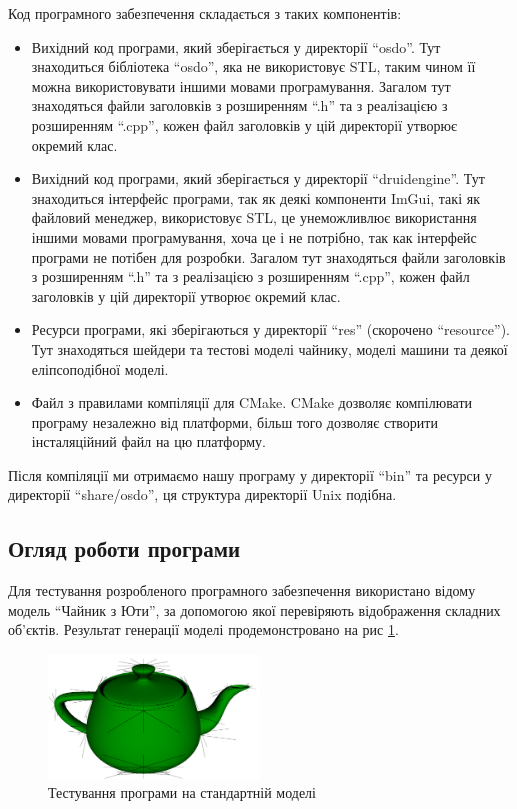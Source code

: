 \let\mypdfximage\pdfximage\def\pdfximage{\immediate\mypdfximage}\documentclass[14pt,a4paper]{extarticle}
\theoremstyle{definition}
\renewcommand{\[}{\begin{singlespace}\begin{equation*}}
\renewcommand{\]}{\end{equation*}\end{singlespace}}
\renewcommand{\+}{\discretionary{\mbox{\scriptsize$\hookleftarrow$}}{}{}}
\begin{document}
Код програмного забезпечення складається з таких компонентів:
\begin{itemize}
\item Вихідний код програми, який зберігається у директорії ``osdo''. Тут знаходиться бібліотека ``osdo'', яка не використовує STL, таким чином її можна використовувати іншими мовами програмування. Загалом тут знаходяться файли заголовків з розширенням ``.h'' та з реалізацією з розширенням ``.cpp'', кожен файл заголовків у цій директорії утворює окремий клас.
\item Вихідний код програми, який зберігається у директорії ``druidengine''. Тут знаходиться інтерфейс програми, так як деякі компоненти ImGui, такі як файловий менеджер, використовує STL, це унеможливлює використання іншими мовами програмування, хоча це і не потрібно, так как інтерфейс програми не потібен для розробки. Загалом тут знаходяться файли заголовків з розширенням ``.h'' та з реалізацією з розширенням ``.cpp'', кожен файл заголовків у цій директорії утворює окремий клас.
\item Ресурси програми, які зберігаються у директорії ``res'' (скорочено ``resource''). Тут знаходяться шейдери та тестові моделі чайнику, моделі машини та деякої еліпсоподібної моделі.
\item Файл з правилами компіляції для CMake. CMake дозволяє компілювати програму незалежно від платформи, більш того дозволяє створити інсталяційний файл на цю платформу.
\end{itemize}

Після компіляції ми отримаємо нашу програму у директорії ``bin'' та ресурси у директорії ``share/osdo'', ця структура директорії Unix подібна.

\subsection{Огляд роботи програми}

Для тестування розробленого програмного забезпечення використано відому модель ``Чайник з Юти'', за допомогою якої перевіряють відображення складних об'єктів.  Результат генерації моделі продемонстровано на рис \ref{fig:testing-teapot}.

\begin{figure}[!htb]
    \centering
    \includegraphics[width=0.5\textwidth]{testing-teapot.png}
    \caption{Тестування програми на стандартній моделі}\label{fig:testing-teapot}
\end{figure}
\end{document}
